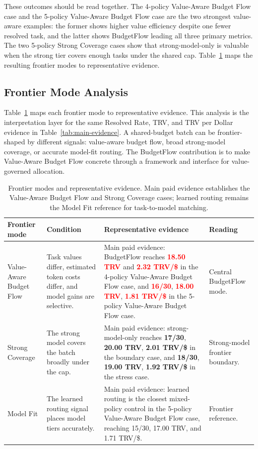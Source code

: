 \documentclass[sigconf,review,anonymous]{acmart}
\newcommand{\method}{BudgetFlow\xspace}
\newcommand{\trv}{TRV\xspace}
\newcommand{\pos}[1]{\textcolor{red}{\textbf{#1}}}
\newcommand{\ctrl}[1]{\textcolor{bfblue}{\textbf{#1}}}
\begin{document}
These outcomes should be read together. The 4-policy Value-Aware Budget Flow case and the 5-policy Value-Aware Budget Flow case are the two strongest value-aware examples: the former shows higher value efficiency despite one fewer resolved task, and the latter shows \method leading all three primary metrics. The two 5-policy Strong Coverage cases show that strong-model-only is valuable when the strong tier covers enough tasks under the shared cap. Table~\ref{tab:frontier-modes} maps the resulting frontier modes to representative evidence.

\subsection{Frontier Mode Analysis}
Table~\ref{tab:frontier-modes} maps each frontier mode to representative evidence. This analysis is the interpretation layer for the same Resolved Rate, \trv, and \trv per Dollar evidence in Table~\ref{tab:main-evidence}. A shared-budget batch can be frontier-shaped by different signals: value-aware budget flow, broad strong-model coverage, or accurate model-fit routing. The \method contribution is to make Value-Aware Budget Flow concrete through a framework and interface for value-governed allocation.

\begin{table}[t]
\centering
\footnotesize
\begin{tabular}{@{}p{}p{}p{}p{}@{}}
\toprule
Frontier mode & Condition & Representative evidence & Reading \\
\midrule
Value-Aware Budget Flow & Task values differ, estimated token costs differ, and model gains are selective. & Main paid evidence: \method reaches \pos{18.50 \trv} and \pos{2.32 \trv/\$} in the 4-policy Value-Aware Budget Flow case, and \pos{16/30}, \pos{18.00 \trv}, \pos{1.81 \trv/\$} in the 5-policy Value-Aware Budget Flow case. & Central \method mode. \\
Strong Coverage & The strong model covers the batch broadly under the cap. & Main paid evidence: strong-model-only reaches \ctrl{17/30}, \ctrl{20.00 \trv}, \ctrl{2.01 \trv/\$} in the boundary case, and \ctrl{18/30}, \ctrl{19.00 \trv}, \ctrl{1.92 \trv/\$} in the stress case. & Strong-model frontier boundary. \\
Model Fit & The learned routing signal places model tiers accurately. & Main paid evidence: learned routing is the closest mixed-policy control in the 5-policy Value-Aware Budget Flow case, reaching 15/30, 17.00 \trv, and 1.71 \trv/\$. & Frontier reference. \\
\bottomrule
\end{tabular}
\caption{Frontier modes and representative evidence. Main paid evidence establishes the Value-Aware Budget Flow and Strong Coverage cases; learned routing remains the Model Fit reference for task-to-model matching.}
\label{tab:frontier-modes}
\end{table}
\end{document}
